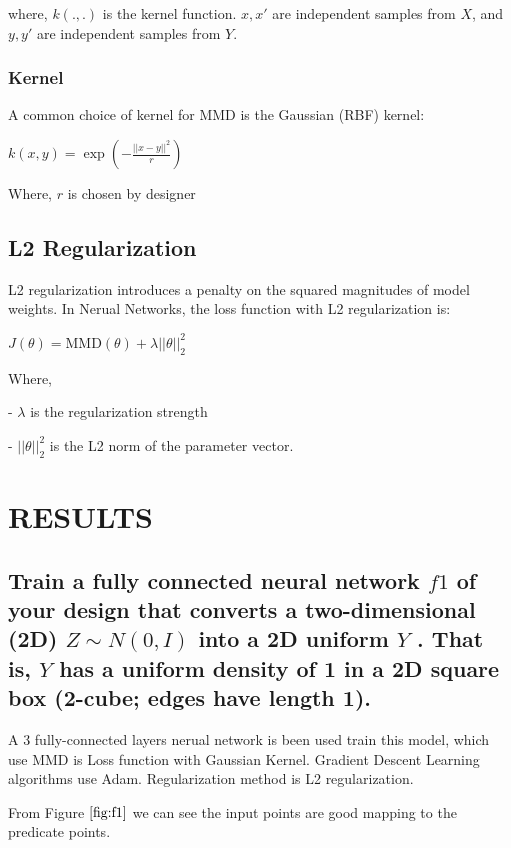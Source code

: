 \documentclass{article}
\begin{document}
where, $k(.,.)$ is the kernel function. 
$x, x'$ are independent samples from $X$,
and $y, y'$ are independent samples from $Y$.

\subsubsection{Kernel}
\label{sssec:kernel}

A common choice of kernel for MMD is the Gaussian (RBF) kernel:

$ k(x, y) = \exp\left(-\frac{||x - y||^2}{r}\right) $

Where, $r$ is chosen by designer



\subsection{L2 Regularization}
\label{ssec:l2regularization}

L2 regularization \cite{rumelhart1986learning} introduces a penalty on the squared magnitudes of model weights. 
In Nerual Networks, the loss function with L2 regularization is:

$ J(\theta) = \text{MMD}(\theta) + \lambda ||\theta||_2^2 $

Where,

- $\lambda$ is the regularization strength

- $||\theta||_2^2$ is the L2 norm of the parameter vector.

\section{RESULTS}
\label{sec:results}

\subsection{Train a fully connected neural network $f1$ of your design that converts a
two-dimensional (2D) $Z \sim N (0, I)$ into a 2D uniform $Y$ . That is, $Y$ has
a uniform density of 1 in a 2D square box (2-cube; edges have length 1).}
\label{ssec:q1}

A 3 fully-connected layers nerual network is been used train this model, 
which use MMD is Loss function with Gaussian Kernel. 
Gradient Descent Learning algorithms use Adam.
Regularization method is L2 regularization.

From Figure $\ref{fig:f1}$ we can see the input points are good mapping to the predicate points.
\end{document}
